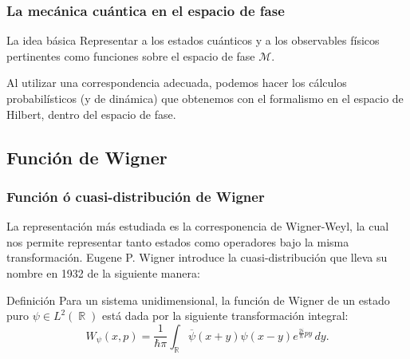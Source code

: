 \documentclass[10pt,spanish]{beamer}
\DeclareMathOperator{\R}{\mathbb{R}}
\begin{document}




  \begin{frame}
    \frametitle{La mecánica cuántica en el espacio de fase}

    \begin{block}{La idea básica}
      Representar a los estados cuánticos y a los
      observables físicos pertinentes como funciones sobre
      el espacio de fase $\mathcal M$.
    \end{block}

    \vspace{10mm}

    \pause

    Al utilizar una correspondencia adecuada, podemos hacer
    los cálculos probabilísticos (y de dinámica) que
    obtenemos con el formalismo en el espacio de Hilbert,
    dentro del espacio de fase.
  \end{frame}

  \subsection{Función de Wigner}

  \begin{frame}
    \frametitle{Función ó cuasi-distribución de Wigner}

    La representación más estudiada es la corresponencia de
    Wigner-Weyl, la cual nos permite representar tanto
    estados como operadores bajo la misma transformación.
    Eugene P.  Wigner introduce la cuasi-distribución que
    lleva su nombre en 1932 de la siguiente manera:

    \vspace{5mm}

    \pause

    \begin{block}{Definición}
      Para un sistema unidimensional, la función de Wigner
      de un estado puro $\psi \in L^2(\R)$ está dada por la
      siguiente transformación integral:
      \begin{equation}
        W_\psi(x,p)
        = \frac{1}{\hbar \pi} \int_{\R}
        \overline{\psi}(x+y) \psi(x-y)
        e^{\frac{2i}{\hbar} p y } \, dy.
      \end{equation}
    \end{block}
  \end{frame}
\end{document}
